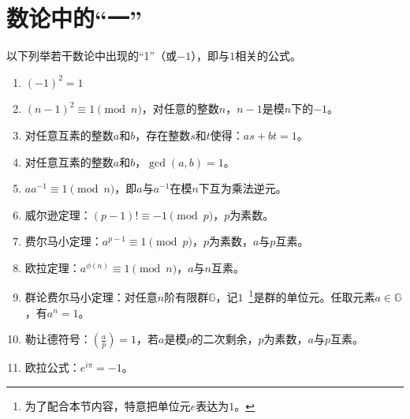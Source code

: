 \chapter{数论中的“一”}
\label{chap:one}
以下列举若干数论中出现的“1”（或$-1$），即与$1$相关的公式。

\begin{enumerate}
\item $(-1)^2 = 1$

\item $ (n-1)^2 \equiv 1 \pmod{n}$，对任意的整数$n$，$n-1$是模$n$下的$-1$。

\item 对任意互素的整数$a$和$b$，存在整数$s$和$t$使得：$as + bt = 1$。

\item 对任意互素的整数$a$和$b$，$\gcd(a, b) =1$。

\item $a a^{-1} \equiv 1 \pmod{n}$，即$a$与$a^{-1}$在模$n$下互为乘法逆元。

\item 威尔逊定理：$(p-1)! \equiv - 1 \pmod{p}$，$p$为素数。

\item 费尔马小定理：$a^{p-1} \equiv 1 \pmod{p}$，$p$为素数，$a$与$p$互素。

\item 欧拉定理：$a^{\phi(n)} \equiv 1 \pmod{n}$，$a$与$n$互素。

\item 群论费尔马小定理：对任意$n$阶有限群$\mathbb{G}$，记$1$~\footnote{为了配合本节内容，特意把单位元$e$表达为$1$。}是群的单位元。任取元素$a\in \mathbb{G}$，有$a^n = 1$。

\item 勒让德符号：$\left(\frac{a}{p}\right) = 1$，若$a$是模$p$的二次剩余，$p$为素数，$a$与$p$互素。

\item  欧拉公式：$e^{i \pi} =  -1$。
\end{enumerate}
